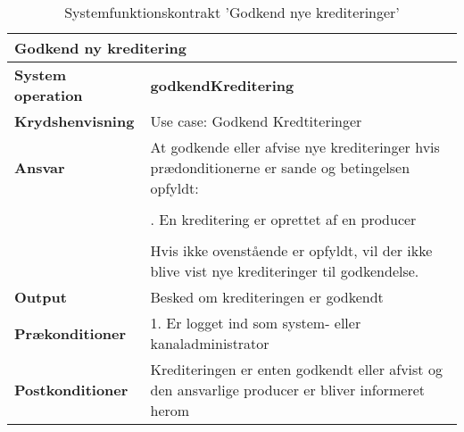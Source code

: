 \begin{table}[H]
    \begin{tabularx}{\textwidth}{|p{4cm}|X|}
        \hline
        \multicolumn{2}{|X|}{\textbf{Godkend ny kreditering}}\\
        \hline
        \textbf{System operation}       & \textbf{godkendKreditering} \\ \hline
        \textbf{Krydshenvisning}        & Use case: Godkend Kredtiteringer \\ \hline
        \textbf{Ansvar}                 & At godkende eller afvise nye krediteringer hvis prædonditionerne er sande og betingelsen opfyldt:  \\ 
                                        & \\
                                        & \quad 1. En kreditering er oprettet af en producer \\
                                        & \\
                                        & Hvis ikke ovenstående er opfyldt, vil der ikke blive vist nye krediteringer til godkendelse. \\ \hline
        \textbf{Output}                 & Besked om krediteringen er godkendt \\ \hline
        \textbf{Prækonditioner}         & 1. Er logget ind som system- eller kanaladministrator \\ \hline
        \textbf{Postkonditioner}        & Krediteringen er enten godkendt eller afvist og den ansvarlige producer er bliver informeret herom \\ \hline
    \end{tabularx}
    \caption{Systemfunktionskontrakt 'Godkend nye krediteringer'}
    \label{tab:kontrakter_Godkend_nye_krediteringer}
\end{table}